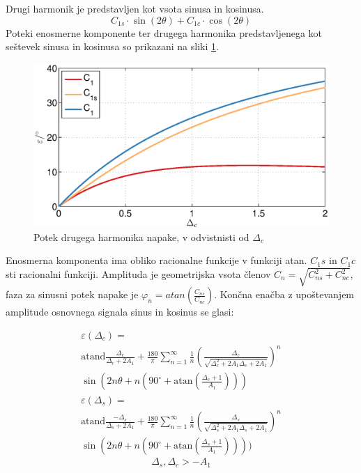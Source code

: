 \documentclass[a4paper]{article}
\begin{document}
Drugi harmonik je predstavljen kot vsota sinusa in kosinusa.
\begin{equation}
C_{1s} \cdot\sin(2\theta)+C_{1c} \cdot\cos(2\theta)
\end{equation}
Poteki enosmerne komponente ter drugega harmonika predstavljenega kot seštevek sinusa in kosinusa so prikazani na sliki \ref{fig:dc}.
\begin{figure}[!htb]
	\begin{center}
		\includegraphics[width=\linewidth]{./Slike/dc.eps}
		\caption{Potek drugega harmonika napake, v odvistnisti od $\Delta_{c}$} \label{fig:dc}
	\end{center}
\end{figure}

Enosmerna komponenta ima obliko racionalne funkcije v funkciji atan.
$C_1s$ in $C_1c$ sti racionalni funkciji. Amplituda je geometrijska vsota členov $C_n = \sqrt{C_{ns}^2+C_{nc}^2}$, faza za sinusni potek napake je $\varphi_{n} = atan(\frac{C_{ns}}{C_{nc}})$. Končna enačba z upoštevanjem amplitude osnovnega signala sinus in kosinus se glasi:

\begin{multline}
\label{equ:dc_err}
\varepsilon(\Delta_c) =\\ \mathrm{atand}\frac{\Delta_c}{\Delta_c+2 A_1}+\frac{180}{\pi} \sum_{n=1}^{\infty}\frac{1}{n} (\frac{\Delta_c}{\sqrt{\Delta_c^2+2 A_1 \Delta_c+2 A_1}})^n\\ \sin (2n \theta+n (90^\circ+ \mathrm{ atan}(\frac{\Delta_c+1}{A_1})))
\end{multline}
\begin{multline}
\label{equ:ds_err}
\varepsilon(\Delta_s) =\\ \mathrm{atand}\frac{-\Delta_s}{\Delta_s+2 A_1}+\frac{180}{\pi} \sum_{n=1}^{\infty}\frac{1}{n} (\frac{\Delta_s}{\sqrt{\Delta_s^2+2 A_1 \Delta_s+2A_1}})^n\\ \sin (2n \theta+n (90^\circ+ \mathrm{ atan}(\frac{\Delta_s+1}{A_1}))))
\end{multline}
\begin{equation*}
\Delta_s, \Delta_c > -A_1
\end{equation*}
\end{document}
